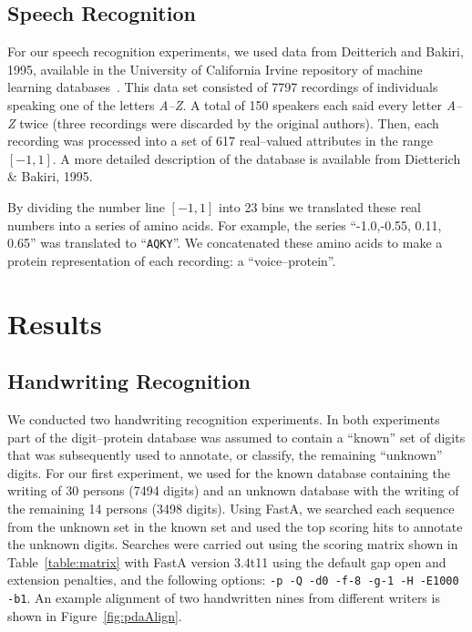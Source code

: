 		
	\subsection{Speech Recognition}
		For our speech recognition experiments, we used data from
		Deitterich and Bakiri, 1995, %
		available in the University of California Irvine repository
		of machine learning databases~\cite{uci1998ucirepository}.
		This data set consisted of 7797 recordings of individuals
		speaking one of the letters \emph{A--Z}.  A total of 150
		speakers each said every letter \emph{A--Z} twice (three
		recordings were discarded by the original authors).
		Then, each recording was processed into a set of 617
		real--valued attributes in the range $[-1,1]$.	A more
		detailed description of the database is available from
		Dietterich \& Bakiri, 1995.%

		By dividing the number line $[-1,1]$ into 23 bins we translated these real numbers into a series
		of amino acids.  For example, the series ``-1.0,-0.55, 0.11, 0.65'' was translated
		to ``{\texttt{AQKY}}''.  We concatenated these amino acids to make a protein representation
		of each recording: a ``voice--protein''.


\section{Results}
	\subsection{Handwriting Recognition}

		We conducted two handwriting recognition experiments.
		In both experiments part of the digit--protein database was assumed to contain a
		``known'' set of digits that was subsequently used to annotate,
		or classify, the remaining ``unknown'' digits.	For our
		first experiment, we used for the known database containing the
		writing of 30 persons (7494 digits) and an unknown database
		with the writing of the remaining 14 persons (3498 digits).
		Using FastA, we searched each sequence from the unknown
		set in the known set and used the top scoring hits to
		annotate the unknown digits.  Searches were carried out
		using the scoring matrix shown in Table~\vref{table:matrix}
		with FastA version 3.4t11 using the default gap open and
		extension penalties, and the following options: \texttt{-p
		-Q -d0 -f-8 -g-1 -H -E1000 -b1}.  An example alignment of
		two handwritten nines from different writers is shown in
		Figure~\vref{fig:pdaAlign}.


